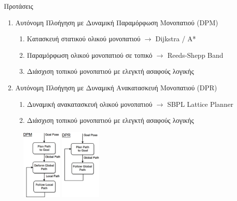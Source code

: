 \documentclass[10pt, compress]{beamer}
\begin{document}
\begin{frame}{Προτάσεις}
	\begin{enumerate}
		\item Αυτόνομη Πλοήγηση με Δυναμική Παραμόρφωση Μονοπατιού (DPM)
		\vspace{-0.5cm}
		\begin{enumerate}
			\item Κατασκευή στατικού ολικού μονοπατιού $\rightarrow$ Dijkstra / A*
			\item Παραμόρφωση ολικού μονοπατιού σε τοπικό $\rightarrow$ Reeds-Shepp Band
			\item Διάσχιση τοπικού μονοπατιού με ελεγκτή ασαφούς λογικής
		\end{enumerate}
		\item Αυτόνομη Πλοήγηση με Δυναμική Ανακατασκευή Μονοπατιού (DPR)
		\begin{enumerate}
			\item Δυναμική ανακατασκευή ολικού μονοπατιού $\rightarrow$ SBPL Lattice Planner
			\item Διάσχιση τοπικού μονοπατιού με ελεγκτή ασαφούς λογικής
		\end{enumerate}
		
	\end{enumerate}
	\begin{figure}
		\centering
		\includegraphics[width=2cm]{Figures/dpm.png}
		\hspace{2cm}
		\includegraphics[width=2cm]{Figures/dpr.png}
	\end{figure}
\end{frame}
\end{document}

